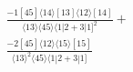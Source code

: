 \documentclass[varwidth, border=5pt]{standalone}
\begin{document}
\begin{my}
$\begin{gathered}
\scriptscriptstyle\frac{-1[45]⟨14⟩[13]⟨12⟩[14]}{⟨13⟩⟨45⟩⟨1|2+3|1]^2}+\\
\scriptscriptstyle\frac{-2[45]⟨12⟩⟨15⟩[15]}{⟨13⟩^2⟨45⟩⟨1|2+3|1]}\phantom{+}
\end{gathered}$
\end{my}
\end{document}
